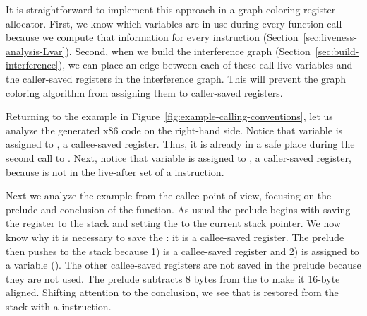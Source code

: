 \documentclass[7x10]{TimesAPriori_MIT}%
\begin{document}
It is straightforward to implement this approach in a graph coloring
register allocator. First, we know which variables are in use during
every function call because we compute that information for every
instruction (Section~\ref{sec:liveness-analysis-Lvar}). Second, when
we build the interference graph
(Section~\ref{sec:build-interference}), we can place an edge between
each of these call-live variables and the caller-saved registers in
the interference graph. This will prevent the graph coloring algorithm
from assigning them to caller-saved registers.

Returning to the example in
Figure~\ref{fig:example-calling-conventions}, let us analyze the
generated x86 code on the right-hand side. Notice that variable
 is assigned to , a callee-saved register. Thus, it
is already in a safe place during the second call to
. Next, notice that variable  is assigned to
, a caller-saved register, because  is not in the
live-after set of a  instruction.

Next we analyze the example from the callee point of view, focusing on
the prelude and conclusion of the  function. As usual the
prelude begins with saving the  register to the stack and
setting the  to the current stack pointer. We now know why
it is necessary to save the : it is a callee-saved register.
The prelude then pushes  to the stack because 1) 
is a callee-saved register and 2)  is assigned to a variable
(). The other callee-saved registers are not saved in the
prelude because they are not used. The prelude subtracts 8 bytes from
the  to make it 16-byte aligned. Shifting attention to the
conclusion, we see that  is restored from the stack with a
 instruction.
\end{document}
